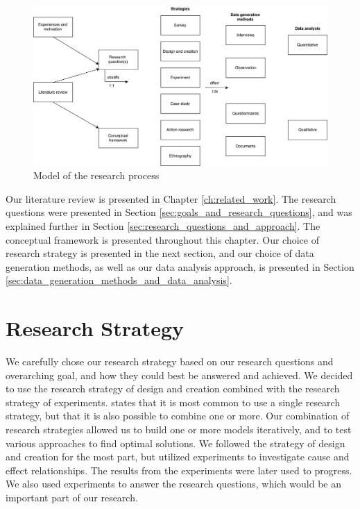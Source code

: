 \begin{figure}[ht]
    \centering
    \includegraphics[width=1\textwidth]{fig/methodology/research_strategies.png}
    \caption{Model of the research process}
    \label{fig:model_research_process}
\end{figure}

Our literature review is presented in Chapter \ref{ch:related_work}. The research questions were presented in Section \ref{sec:goals_and_research_questions}, and was explained further in Section \ref{sec:research_questions_and_approach}. The conceptual framework is presented throughout this chapter. Our choice of research strategy is presented in the next section, and our choice of data generation methods, as well as our data analysis approach, is presented in Section \ref{sec:data_generation_methods_and_data_analysis}.


\section{Research Strategy}
\label{sec:research_strategy}
We carefully chose our research strategy based on our research questions and overarching goal, and how they could best be answered and achieved. We decided to use the research strategy of design and creation combined with the research strategy of experiments. \cite{oates2005researching} states that it is most common to use a single research strategy, but that it is also possible to combine one or more. Our combination of research strategies allowed us to build one or more models iteratively, and to test various approaches to find optimal solutions. We followed the strategy of design and creation for the most part, but utilized experiments to investigate cause and effect relationships. The results from the experiments were later used to progress. We also used experiments to answer the research questions, which would be an important part of our research.

